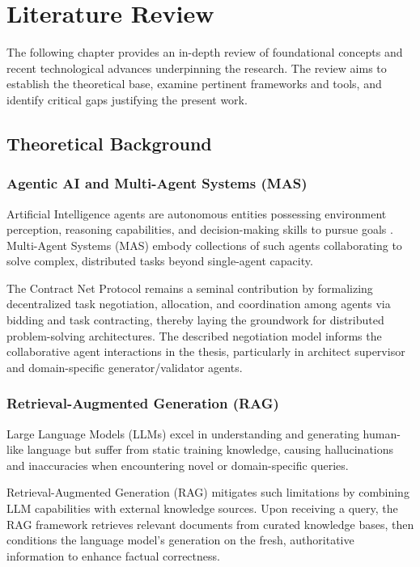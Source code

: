 \chapter{Literature Review}

The following chapter provides an in-depth review of foundational concepts and recent technological advances underpinning the research. The review aims to establish the theoretical base, examine pertinent frameworks and tools, and identify critical gaps justifying the present work.

\section{Theoretical Background}

\subsection{Agentic AI and Multi-Agent Systems (MAS)}

Artificial Intelligence agents are autonomous entities possessing environment perception, reasoning capabilities, and decision-making skills to pursue goals \cite{sycara1998multiagent}. Multi-Agent Systems (MAS) embody collections of such agents collaborating to solve complex, distributed tasks beyond single-agent capacity.

The Contract Net Protocol \cite{smith1980contract} remains a seminal contribution by formalizing decentralized task negotiation, allocation, and coordination among agents via bidding and task contracting, thereby laying the groundwork for distributed problem-solving architectures. The described negotiation model informs the collaborative agent interactions in the thesis, particularly in architect supervisor and domain-specific generator/validator agents.

\subsection{Retrieval-Augmented Generation (RAG)}

Large Language Models (LLMs) excel in understanding and generating human-like language but suffer from static training knowledge, causing hallucinations and inaccuracies when encountering novel or domain-specific queries.

Retrieval-Augmented Generation (RAG) \cite{lewis2020rag} mitigates such limitations by combining LLM capabilities with external knowledge sources. Upon receiving a query, the RAG framework retrieves relevant documents from curated knowledge bases, then conditions the language model's generation on the fresh, authoritative information to enhance factual correctness.


